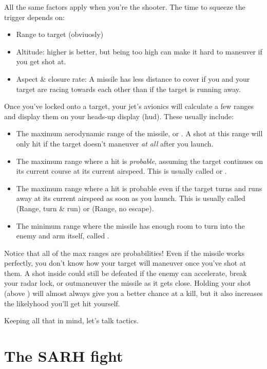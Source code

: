 All the same factors apply when you're the shooter.
The time to squeeze the trigger depends on:
\begin{itemize}
\item Range to target (obviuosly)
\item Altitude: higher is better, but being too high can make it hard to
    maneuver if you get shot at.
\item Aspect \& closure rate:
    A missile has less distance to cover if you and your target are racing
    towards each other than if the target is running away.
\end{itemize}
Once you've locked onto a target,
your jet's avionics will calculate a few ranges and display them on your
heads-up display \ac{(hud)}.
These usually include:
\begin{itemize}
\item The maximum aerodynamic range of the missile, or
    .
    A shot at this range will only hit if the target doesn't maneuver
    \emph{at all} after you launch.
\item The maximum range where a hit is \emph{probable},
    assuming the target continues on its current course at its current airspeed.
    This is usually called  or .
\item The maximum range where a hit is probable
    even if the target turns and runs away at its current airspeed
    as soon as you launch.
    This is usually called  (Range, turn \& run)
    or  (Range, no escape).
\item The minimum range where the missile has enough room to turn into the
    enemy and arm itself, called .
\end{itemize}
Notice that all of the max ranges are probabilities!
Even if the missile works perfectly,
you don't know how your target will maneuver once you've shot at them.
A shot inside  could still be defeated if the enemy can accelerate,
break your radar lock, or outmaneuver the missile as it gets close.
Holding your shot (above ) will almost always give you
a better chance at a kill,
but it also increases the likelyhood you'll get hit yourself.

Keeping all that in mind, let's talk tactics.

\section{The SARH fight}

